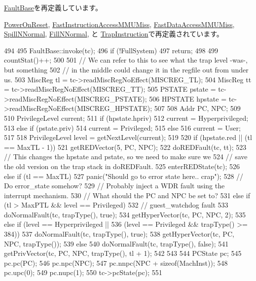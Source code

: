 \hyperlink{classFaultBase_a2bd783b42262278d41157d428e1f8d6f}{FaultBase}を再定義しています。

\hyperlink{classSparcISA_1_1PowerOnReset_a2bd783b42262278d41157d428e1f8d6f}{PowerOnReset}, \hyperlink{classSparcISA_1_1FastInstructionAccessMMUMiss_a2bd783b42262278d41157d428e1f8d6f}{FastInstructionAccessMMUMiss}, \hyperlink{classSparcISA_1_1FastDataAccessMMUMiss_a2bd783b42262278d41157d428e1f8d6f}{FastDataAccessMMUMiss}, \hyperlink{classSparcISA_1_1SpillNNormal_a2bd783b42262278d41157d428e1f8d6f}{SpillNNormal}, \hyperlink{classSparcISA_1_1FillNNormal_a2bd783b42262278d41157d428e1f8d6f}{FillNNormal}, と \hyperlink{classSparcISA_1_1TrapInstruction_a2bd783b42262278d41157d428e1f8d6f}{TrapInstruction}で再定義されています。


\begin{DoxyCode}
494 {
495     FaultBase::invoke(tc);
496     if (!FullSystem)
497         return;
498 
499     countStat()++;
500 
501     // We can refer to this to see what the trap level -was-, but something
502     // in the middle could change it in the regfile out from under us.
503     MiscReg tl = tc->readMiscRegNoEffect(MISCREG_TL);
504     MiscReg tt = tc->readMiscRegNoEffect(MISCREG_TT);
505     PSTATE pstate = tc->readMiscRegNoEffect(MISCREG_PSTATE);
506     HPSTATE hpstate = tc->readMiscRegNoEffect(MISCREG_HPSTATE);
507 
508     Addr PC, NPC;
509 
510     PrivilegeLevel current;
511     if (hpstate.hpriv)
512         current = Hyperprivileged;
513     else if (pstate.priv)
514         current = Privileged;
515     else
516         current = User;
517 
518     PrivilegeLevel level = getNextLevel(current);
519 
520     if (hpstate.red || (tl == MaxTL - 1)) {
521         getREDVector(5, PC, NPC);
522         doREDFault(tc, tt);
523         // This changes the hpstate and pstate, so we need to make sure we
524         // save the old version on the trap stack in doREDFault.
525         enterREDState(tc);
526     } else if (tl == MaxTL) {
527         panic("Should go to error state here.. crap\n");
528         // Do error_state somehow?
529         // Probably inject a WDR fault using the interrupt mechanism.
530         // What should the PC and NPC be set to?
531     } else if (tl > MaxPTL && level == Privileged) {
532         // guest_watchdog fault
533         doNormalFault(tc, trapType(), true);
534         getHyperVector(tc, PC, NPC, 2);
535     } else if (level == Hyperprivileged ||
536                (level == Privileged && trapType() >= 384)) {
537         doNormalFault(tc, trapType(), true);
538         getHyperVector(tc, PC, NPC, trapType());
539     } else {
540         doNormalFault(tc, trapType(), false);
541         getPrivVector(tc, PC, NPC, trapType(), tl + 1);
542     }
543 
544     PCState pc;
545     pc.pc(PC);
546     pc.npc(NPC);
547     pc.nnpc(NPC + sizeof(MachInst));
548     pc.upc(0);
549     pc.nupc(1);
550     tc->pcState(pc);
551 }
\end{DoxyCode}
